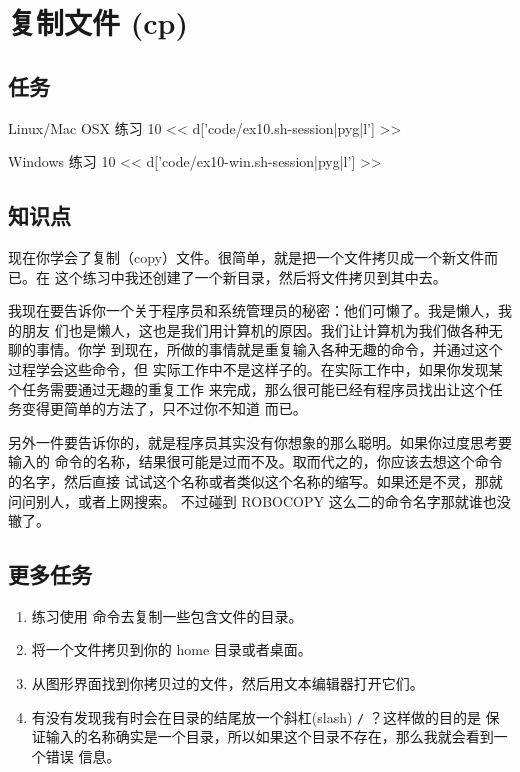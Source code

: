 \chapter{复制文件 (cp)}

\section{任务}

\begin{code}{Linux/Mac OSX 练习 10}
<< d['code/ex10.sh-session|pyg|l'] >>
\end{code}

\begin{code}{Windows 练习 10}
<< d['code/ex10-win.sh-session|pyg|l'] >>
\end{code}

\section{知识点}

现在你学会了复制（copy）文件。很简单，就是把一个文件拷贝成一个新文件而已。在
这个练习中我还创建了一个新目录，然后将文件拷贝到其中去。

我现在要告诉你一个关于程序员和系统管理员的秘密：他们可懒了。我是懒人，我的朋友
们也是懒人，这也是我们用计算机的原因。我们让计算机为我们做各种无聊的事情。你学
到现在，所做的事情就是重复输入各种无趣的命令，并通过这个过程学会这些命令，但
实际工作中不是这样子的。在实际工作中，如果你发现某个任务需要通过无趣的重复工作
来完成，那么很可能已经有程序员找出让这个任务变得更简单的方法了，只不过你不知道
而已。

另外一件要告诉你的，就是程序员其实没有你想象的那么聪明。如果你过度思考要输入的
命令的名称，结果很可能是过而不及。取而代之的，你应该去想这个命令的名字，然后直接
试试这个名称或者类似这个名称的缩写。如果还是不灵，那就问问别人，或者上网搜索。
不过碰到 ROBOCOPY 这么二的命令名字那就谁也没辙了。

\section{更多任务}

\begin{enumerate}
\item 练习使用  命令去复制一些包含文件的目录。
\item 将一个文件拷贝到你的 home 目录或者桌面。
\item 从图形界面找到你拷贝过的文件，然后用文本编辑器打开它们。
\item 有没有发现我有时会在目录的结尾放一个斜杠(slash) \verb|/| ？这样做的目的是
    保证输入的名称确实是一个目录，所以如果这个目录不存在，那么我就会看到一个错误
    信息。
\end{enumerate}

